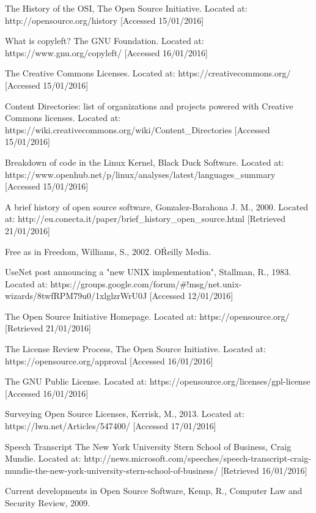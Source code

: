 \begin{thebibliography}{100}
 The History of the OSI,
  The Open Source Initiative.
  Located at: http://opensource.org/history [Accessed 15/01/2016]

 What is copyleft?
  The GNU Foundation.
  Located at: https://www.gnu.org/copyleft/ [Accessed 16/01/2016]

 The Creative Commons Licenses.
  Located at: https://creativecommons.org/ [Accessed 15/01/2016]

 Content Directories: list of organizations and projects powered with Creative Commons licenses.
  Located at: https://wiki.creativecommons.org/wiki/Content\_Directories [Accessed 15/01/2016]

 Breakdown of code in the Linux Kernel,
  Black Duck Software.
  Located at: https://www.openhub.net/p/linux/analyses/latest/languages\_summary [Accessed 15/01/2016]

 A brief history of open source software,
  Gonzalez-Barahona J. M.,
  2000.
  Located at: http://eu.conecta.it/paper/brief\_history\_open\_source.html [Retrieved 21/01/2016]

 Free as in Freedom,
  Williams, S.,
  2002.
  O\'Reilly Media.

 UseNet post announcing a "new UNIX implementation",
  Stallman, R.,
  1983.
  Located at: https://groups.google.com/forum/\#!msg/net.unix-wizards/8twfRPM79u0/1xlglzrWrU0J [Accessed 12/01/2016]

 The Open Source Initiative Homepage.
  Located at: https://opensource.org/ [Retrieved 21/01/2016]

 The License Review Process,
  The Open Source Initiative.
  Located at: https://opensource.org/approval [Accessed 16/01/2016]

 The GNU Public License.
  Located at: https://opensource.org/licenses/gpl-license [Accessed 16/01/2016]

 Surveying Open Source Licenses,
  Kerrisk, M.,
  2013.
  Located at: https://lwn.net/Articles/547400/ [Accessed 17/01/2016]

 Speech Transcript\: The New York University Stern School of Business,
    Craig Mundie.
    Located at: http://news.microsoft.com/speeches/speech-transcript-craig-mundie-the-new-york-university-stern-school-of-business/ [Retrieved 16/01/2016]

 Current developments in Open Source Software,
    Kemp, R.,
    Computer Law and Security Review,
    2009.


\end{thebibliography}
